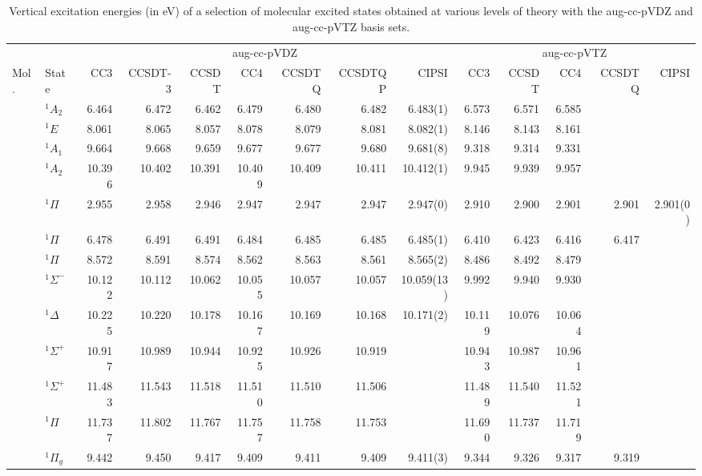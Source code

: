 \documentclass[aps,prb,reprint,noshowkeys,superscriptaddress]{revtex4-1}
\newcommand{\mc}{\multicolumn}
\begin{document}
\begin{squeezetable}
\begin{table*}
	\caption{Vertical excitation energies (in eV) of a selection of molecular excited states obtained at various levels of theory with the aug-cc-pVDZ and aug-cc-pVTZ basis sets.
	\label{tab:BigTab}}
	\begin{ruledtabular}
	\begin{tabular}{llrrrrrrrrrrrr}
				&		&	\mc{7}{c}{aug-cc-pVDZ}		&		\mc{5}{c}{aug-cc-pVTZ}		\\	
				\cline{3-9} \cline{10-14}
	Mol.	&	State				&CC3	&CCSDT-3&CCSDT	&CC4	&CCSDTQ	&CCSDTQP	&CIPSI	
									&CC3	&CCSDT	&CC4	&CCSDTQ	&CIPSI			\\
	\hline
	\ce{NH3}	&	$^1A_2$ 		&6.464	&6.472	&6.462	&6.479	&6.480	&6.482	&6.483(1)	&6.573	&6.571	&6.585	&		\\	
				&	$^1E$			&8.061	&8.065	&8.057	&8.078	&8.079	&8.081	&8.082(1)	&8.146	&8.143	&8.161	&		\\	
				&	$^1A_1$ 		&9.664	&9.668	&9.659	&9.677	&9.677	&9.680	&9.681(8)	&9.318	&9.314	&9.331	&		\\
				&	$^1A_2$ 		&10.396	&10.402	&10.391	&10.409	&10.409	&10.411	&10.412(1)	&9.945	&9.939	&9.957	&		\\
	\ce{BH}		&	$^1\Pi$ 		&2.955	&2.958	&2.946	&2.947	&2.947	&2.947	&2.947(0)	&2.910	&2.900	&2.901	&2.901	&2.901(0)	\\
	\ce{BF}		&	$^1\Pi$ 		&6.478	&6.491	&6.491	&6.484	&6.485	&6.485	&6.485(1)	&6.410	&6.423	&6.416	&6.417	\\
	\ce{CO}		&	$^1\Pi$ 		&8.572	&8.591	&8.574	&8.562	&8.563	&8.561	&8.565(2)	&8.486	&8.492	&8.479	&		\\
				&	$^1\Sigma^-$ 	&10.122	&10.112	&10.062	&10.055	&10.057	&10.057	&10.059(13)	&9.992	&9.940	&9.930	&		\\
				&	$^1\Delta$ 		&10.225	&10.220	&10.178	&10.167	&10.169	&10.168	&10.171(2)	&10.119	&10.076	&10.064	&		\\
				&	$^1\Sigma^+$ 	&10.917	&10.989	&10.944	&10.925	&10.926	&10.919	&			&10.943	&10.987	&10.961	&		\\
				&	$^1\Sigma^+$ 	&11.483	&11.543	&11.518	&11.510	&11.510	&11.506	&			&11.489	&11.540	&11.521	&		\\
				&	$^1\Pi$ 		&11.737	&11.802	&11.767	&11.757	&11.758	&11.753	&			&11.690	&11.737	&11.719	&		\\
	\ce{N2}		&	$^1\Pi_g$  		&9.442	&9.450	&9.417	&9.409	&9.411	&9.409	&9.411(3)	&9.344	&9.326	&9.317	&9.319	\\

\end{tabular}
\end{ruledtabular}
\end{table*}
\end{squeezetable}
\end{document}
